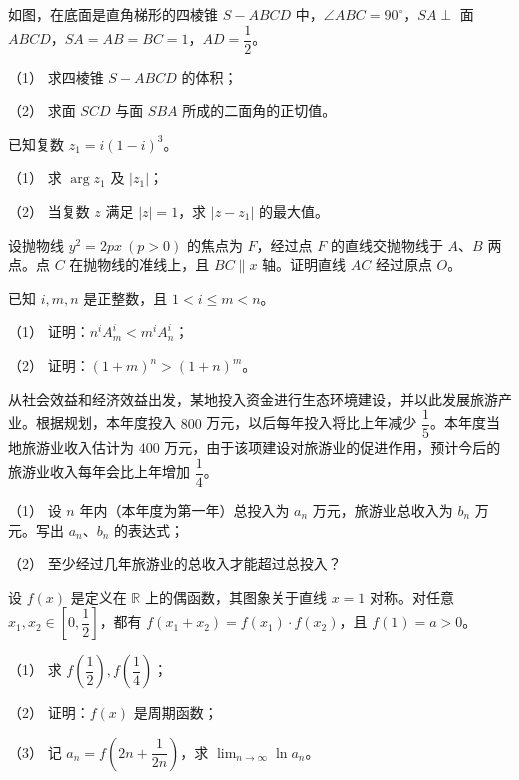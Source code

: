 \Needspace{0.4\textheight}
\begin{question}
如图，在底面是直角梯形的四棱锥 $S-ABCD$ 中，$\angle ABC=90^\circ$，$SA\perp$ 面 $ABCD$，$SA=AB=BC=1$，$AD=\dfrac12$。
\nopagebreak[4]
\begin{center}\end{center}
\nopagebreak[4]
（1） 求四棱锥 $S-ABCD$ 的体积；

（2） 求面 $SCD$ 与面 $SBA$ 所成的二面角的正切值。

\end{question}
\begin{question}
已知复数 $z_1=i(1-i)^3$。

（1） 求 $\arg z_1$ 及 $|z_1|$；

（2） 当复数 $z$ 满足 $|z|=1$，求 $|z-z_1|$ 的最大值。

\end{question}
\begin{question}
设抛物线 $y^2=2px\ (p>0)$ 的焦点为 $F$，经过点 $F$ 的直线交抛物线于 $A$、$B$ 两点。点 $C$ 在抛物线的准线上，且 $BC\parallel x$ 轴。证明直线 $AC$ 经过原点 $O$。

\end{question}
\begin{question}
已知 $i,m,n$ 是正整数，且 $1<i\le m<n$。

（1） 证明：$n^iA_m^i<m^iA_n^i$；

（2） 证明：$(1+m)^n>(1+n)^m$。

\end{question}
\begin{question}
从社会效益和经济效益出发，某地投入资金进行生态环境建设，并以此发展旅游产业。根据规划，本年度投入 $800$ 万元，以后每年投入将比上年减少 $\dfrac15$。本年度当地旅游业收入估计为 $400$ 万元，由于该项建设对旅游业的促进作用，预计今后的旅游业收入每年会比上年增加 $\dfrac14$。

（1） 设 $n$ 年内（本年度为第一年）总投入为 $a_n$ 万元，旅游业总收入为 $b_n$ 万元。写出 $a_n$、$b_n$ 的表达式；

（2） 至少经过几年旅游业的总收入才能超过总投入？

\end{question}
\begin{question}
设 $f(x)$ 是定义在 $\mathbb R$ 上的偶函数，其图象关于直线 $x=1$ 对称。对任意 $x_1,x_2\in\left[0,\dfrac12\right]$，都有 $f(x_1+x_2)=f(x_1)\cdot f(x_2)$，且 $f(1)=a>0$。

（1） 求 $f\left(\dfrac12\right),f\left(\dfrac14\right)$；

（2） 证明：$f(x)$ 是周期函数；

（3） 记 $a_n=f\left(2n+\dfrac1{2n}\right)$，求 $\displaystyle\lim_{n\to\infty}\ln a_n$。

\end{question}